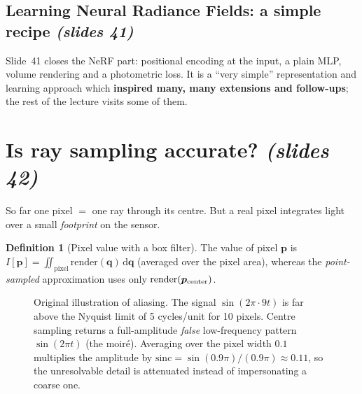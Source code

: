 \documentclass[11pt,a4paper]{article}
\newcommand{\sref}[1]{\texorpdfstring{\emph{(slides #1)}}{(slides #1)}}
\newcommand{\dif}{\,\mathrm{d}}
\theoremstyle{definition}
\newtheorem{definition}{Definition}[section]
\theoremstyle{plain}
\theoremstyle{remark}
\begin{document}
\subsection{Learning Neural Radiance Fields: a simple recipe \sref{41}}

Slide~41 closes the NeRF part: positional encoding at the input, a plain MLP, volume rendering and a photometric loss. It is a ``very simple'' representation and learning approach which \textbf{inspired many, many extensions and follow-ups}; the rest of the lecture visits some of them.

\section{Is ray sampling accurate? \sref{42}}

So far one pixel $=$ one ray through its centre. But a real pixel integrates light over a small \emph{footprint} on the sensor.

\begin{definition}[Pixel value with a box filter]
The value of pixel $\boldsymbol p$ is $I[\boldsymbol p]=\iint_{\text{pixel}}\mathrm{render}(\boldsymbol q)\dif\boldsymbol q$ (averaged over the pixel area), whereas the \emph{point-sampled} approximation uses only $\mathrm{render}(\boldsymbol p_{\rm center})$.
\end{definition}


\begin{figure}[H]
\centering
{}
\caption{Original illustration of aliasing. The signal $\sin(2\pi\cdot9t)$ is far above the Nyquist limit of 5 cycles/unit for 10 pixels. Centre sampling returns a full-amplitude \emph{false} low-frequency pattern $\sin(2\pi t)$ (the moir\'e). Averaging over the pixel width $0.1$ multiplies the amplitude by $\mathrm{sinc}=\sin(0.9\pi)/(0.9\pi)\approx0.11$, so the unresolvable detail is attenuated instead of impersonating a coarse one.}
\end{figure}
\end{document}
